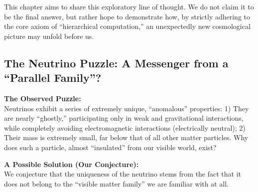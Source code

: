 \documentclass[11pt, a4paper]{article}
\begin{document}
This chapter aims to share this exploratory line of thought. We do not claim it to be the final answer, but rather hope to demonstrate how, by strictly adhering to the core axiom of ``hierarchical computation,'' an unexpectedly new cosmological picture may unfold before us.

\subsection{The Neutrino Puzzle: A Messenger from a ``Parallel Family''?}

\noindent\textbf{The Observed Puzzle:}\\
Neutrinos exhibit a series of extremely unique, ``anomalous'' properties: 1) They are nearly ``ghostly,'' participating only in weak and gravitational interactions, while completely avoiding electromagnetic interactions (electrically neutral); 2) Their mass is extremely small, far below that of all other matter particles. Why does such a particle, almost ``insulated'' from our visible world, exist?

\noindent\textbf{A Possible Solution (Our Conjecture):}\\
We conjecture that the uniqueness of the neutrino stems from the fact that it does not belong to the ``visible matter family'' we are familiar with at all.
\end{document}
